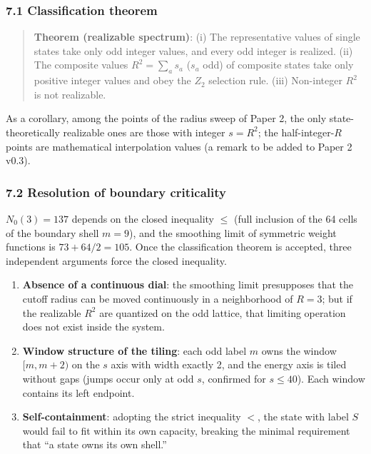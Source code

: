 \documentclass[
]{article}
\providecommand{\tightlist}{%
  \setlength{\itemsep}{0pt}\setlength{\parskip}{0pt}}
\begin{document}
\subsubsection{7.1 Classification theorem}\label{classification-theorem}

\begin{quote}
\textbf{Theorem (realizable spectrum)}: (i) The representative values of
single states take only odd integer values, and every odd integer is
realized. (ii) The composite values \(R^2=\sum_a s_a\) (\(s_a\) odd) of
composite states take only positive integer values and obey the \(Z_2\)
selection rule. (iii) Non-integer \(R^2\) is not realizable.
\end{quote}

As a corollary, among the points of the radius sweep of Paper 2, the
only state-theoretically realizable ones are those with integer
\(s=R^2\); the half-integer-\(R\) points are mathematical interpolation
values (a remark to be added to Paper 2 v0.3).

\subsubsection{7.2 Resolution of boundary
criticality}\label{resolution-of-boundary-criticality}

\(N_0(3)=137\) depends on the closed inequality \(\le\) (full inclusion
of the 64 cells of the boundary shell \(m=9\)), and the smoothing limit
of symmetric weight functions is \(73+64/2=105\). Once the
classification theorem is accepted, three independent arguments force
the closed inequality.

\begin{enumerate}
\def\labelenumi{\arabic{enumi}.}
\tightlist
\item
  \textbf{Absence of a continuous dial}: the smoothing limit presupposes
  that the cutoff radius can be moved continuously in a neighborhood of
  \(R=3\); but if the realizable \(R^2\) are quantized on the odd
  lattice, that limiting operation does not exist inside the system.
\item
  \textbf{Window structure of the tiling}: each odd label \(m\) owns the
  window \([m,m+2)\) on the \(s\) axis with width exactly 2, and the
  energy axis is tiled without gaps (jumps occur only at odd \(s\),
  confirmed for \(s\le40\)). Each window contains its left endpoint.
\item
  \textbf{Self-containment}: adopting the strict inequality \(<\), the
  state with label \(S\) would fail to fit within its own capacity,
  breaking the minimal requirement that ``a state owns its own shell.''
\end{enumerate}
\end{document}
